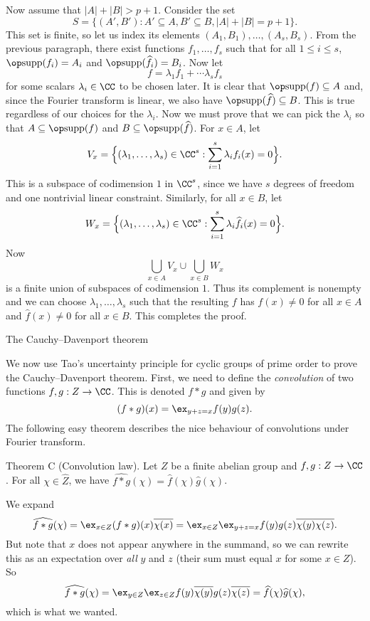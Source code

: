 Now assume that $|A|+|B|>p+1$. Consider the set
$$S = \{(A', B') : A'\subseteq A, B'\subseteq B, |A|+|B| = p+1\}.$$
This set is finite, so let us index its elements $(A_1,B_1),\ldots, (A_s, B_s)$. From
the previous paragraph, there exist functions $f_1,\ldots,f_s$ such that for all $1\le i\le s$,
$\supp(f_i) = A_i$ and $\supp(\hat{f_i}) = B_i$. Now let
$$f = \lambda_1 f_1 + \cdots \lambda_s f_s$$
for some scalars $\lambda_i\in \CC$ to be chosen later. It is clear that $\supp(f) \subseteq A$
and, since the Fourier transform is linear, we also have
$\supp(\hat f) \subseteq B$. This is true regardless of our choices for the $\lambda_i$. Now we must prove
that we can pick the $\lambda_i$ so that $A\subseteq \supp(f)$ and $B\subseteq \supp(\hat f)$. For
$x\in A$, let
$$ V_x = \Bigl\{ (\lambda_1,\ldots,\lambda_s) \in \CC^s : \sum_{i=1}^s \lambda_i f_i(x) = 0 \Bigr\}.$$
This is a subspace of codimension $1$ in $\CC^s$, since we have $s$ degrees of freedom and one nontrivial
linear constraint. Similarly, for all $x\in B$, let
$$ W_x = \Bigl\{ (\lambda_1,\ldots,\lambda_s) \in \CC^s : \sum_{i=1}^s \lambda_i \hat{f_i}(x) = 0 \Bigr\}.$$
Now
$$\bigcup_{x\in A} V_x \cup \bigcup_{x\in B} W_x$$
is a finite union of subspaces of codimension $1$. Thus its complement is nonempty and we can choose
$\lambda_1,\ldots,\lambda_s$ such that the resulting $f$ has $f(x) \ne 0$ for all $x\in A$
and ${\hat f}(x)\ne 0$ for all $x\in B$. This completes the proof.\slug

\advsect The Cauchy--Davenport theorem

We now use Tao's uncertainty principle for cyclic groups of prime order to prove the Cauchy--Davenport theorem.
First, we need to define the {\it convolution} of two functions $f,g:Z \to \CC$. This is denoted $f * g$
and given by
$$ (f*g)(x) = \ex_{y+z = x} f(y)g(z).$$
The following easy theorem describes the nice behaviour of convolutions under Fourier transform.

\parenproclaim Theorem C (Convolution law). Let $Z$ be a finite abelian group and $f,g: Z\to \CC$.
For all $\chi\in \hat Z$, we have $\hat{f * g} (\chi) = \hat f(\chi)\hat g(\chi)$.

\proof We expand
$$\hat{f*g}(\chi) = \ex_{x\in Z} (f*g)(x)\bar{\chi(x)} = \ex_{x\in Z} \ex_{y+z=x} f(y)g(z)\bar{\chi(y)\chi(z)}.$$
But note that $x$ does not appear anywhere in the summand, so we can rewrite this as an expectation over
{\it all} $y$ and $z$ (their sum must equal $x$ for some $x\in Z$). So
$$\hat{f*g}(\chi) = \ex_{y\in Z}\ex_{z\in Z} f(y)\bar{\chi(y)} g(z)\bar{\chi(z)}
=\hat f(\chi)\hat g(\chi),$$
which is what we wanted.\slug

